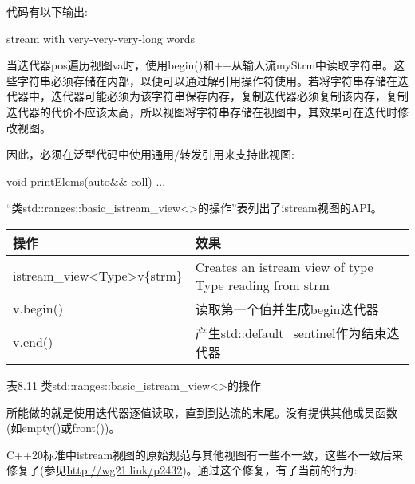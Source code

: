 代码有以下输出:

\begin{shell}
stream
with
very-very-very-long
words
\end{shell}

当迭代器pos遍历视图va时，使用begin()和++从输入流myStrm中读取字符串。这些字符串必须存储在内部，以便可以通过解引用操作符使用。若将字符串存储在迭代器中，迭代器可能必须为该字符串保存内存，复制迭代器必须复制该内存，复制迭代器的代价不应该太高，所以视图将字符串存储在视图中，其效果可在迭代时修改视图。

因此，必须在泛型代码中使用通用/转发引用来支持此视图:

\begin{cpp}
void printElems(auto&& coll) {
	...
}
\end{cpp}


“类std::ranges::basic\_istream\_view<>的操作”表列出了istream视图的API。

\begin{longtable}[c]{|l|l|}
\hline
\textbf{操作} & \textbf{效果}                                     \\ \hline
\endfirsthead
%
\endhead
%
istream\_view\textless{}Type\textgreater v\{strm\} & Creates an istream view of type Type reading from strm \\ \hline
v.begin()          & 读取第一个值并生成begin迭代器 \\ \hline
v.end()            & 产生std::default\_sentinel作为结束迭代器       \\ \hline
\end{longtable}

\begin{center}
表8.11 类std::ranges::basic\_istream\_view<>的操作
\end{center}

所能做的就是使用迭代器逐值读取，直到到达流的末尾。没有提供其他成员函数(如empty()或front())。

C++20标准中istream视图的原始规范与其他视图有一些不一致，这些不一致后来修复了(参见\url{http://wg21.link/p2432})。通过这个修复，有了当前的行为:

